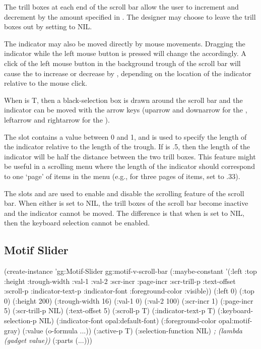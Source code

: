 The trill boxes at each end of the scroll bar allow the user to
increment and decrement  by the amount specified in
.  The designer may choose to leave the trill boxes out
by setting  to NIL.

The indicator may also be moved directly by mouse movements.  Dragging
the indicator while the left mouse button is pressed will change the
 accordingly.  A click of the left mouse button in the
background trough of the scroll bar will cause the  to increase or
decrease by , depending on the location of the
indicator relative to the mouse click.

When  is T, then a black-selection box is
drawn around the scroll bar and the indicator can be moved with the
arrow keys (uparrow and downarrow for the ,
leftarrow and rightarrow for the ).

The  slot contains a value between 0 and 1, and is used to
specify the length of the indicator relative to the length of the trough.
If  is .5, then the length of the
indicator will be half the distance between the two trill boxes.  This
feature might be useful in a scrolling menu where the length of the
indicator should correspond to one `page' of items in the menu (e.g., for
three pages of items, set  to .33).

The slots  and  are used to enable and disable the
scrolling feature of the scroll bar.  When either is set to NIL, the
trill boxes of the scroll bar become inactive and the indicator cannot
be moved.  The difference is that when  is set to NIL, then
the keyboard selection cannot be enabled.

\begin{group}
\section{Motif Slider}
\label{Motif-Slider}

\begin{programexample}
(create-instance 'gg:Motif-Slider gg:motif-v-scroll-bar
   (:maybe-constant '(:left :top :height :trough-width :val-1 :val-2
		      :scr-incr :page-incr :scr-trill-p :text-offset
		      :scroll-p :indicator-text-p :indicator-font
		      :foreground-color :visible))
   (:left 0)
   (:top 0)
   (:height 200)
   (:trough-width 16)
   (:val-1 0)
   (:val-2 100)
   (:scr-incr 1)
   (:page-incr 5)
   (:scr-trill-p NIL)
   (:text-offset 5)
   (:scroll-p T)
   (:indicator-text-p T)
   (:keyboard-selection-p NIL)
   (:indicator-font opal:default-font)
   (:foreground-color opal:motif-gray)
   (:value (o-formula ...))
   (:active-p T)
   (:selection-function NIL)   {\it ; (lambda (gadget value))}
   (:parts (...)))
\end{programexample}
\end{group}

